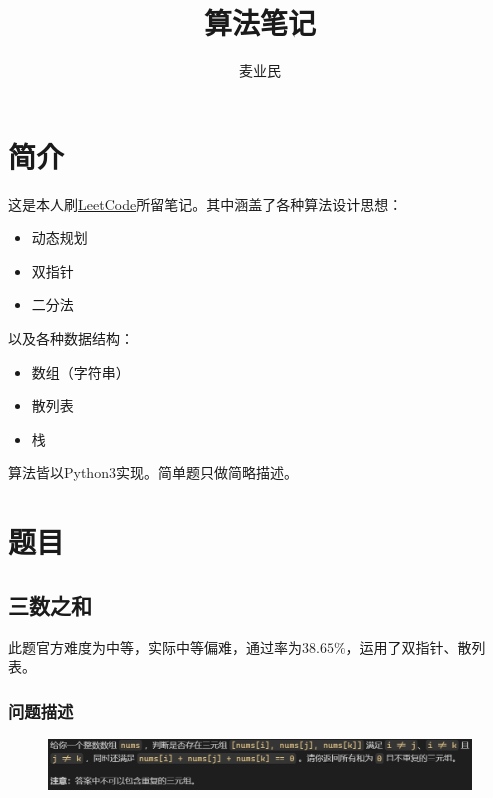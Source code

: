 \documentclass{article}
\begin{document}
\title{算法笔记}
\author{麦业民}
\date{}
\maketitle
\setlength{\parindent}{0em}

\section{简介}
\label{sec:intro}
这是本人刷\href{https://leetcode.cn/}{LeetCode}所留笔记。其中涵盖了各种算法设计思想：
\begin{itemize}
    \item 动态规划
    \item 双指针
    \item 二分法
\end{itemize}
以及各种数据结构：
\begin{itemize}
    \item 数组（字符串）
    \item 散列表
    \item 栈
\end{itemize}
\par
算法皆以Python3实现。简单题只做简略描述。

\section{题目}
\label{sec:questions}

\subsection{三数之和}
\label{sec:three-sum}
此题官方难度为中等，实际中等偏难，通过率为$38.65\%$，运用了双指针、散列表。

\subsubsection*{问题描述}

\begin{figure}[H]
\includegraphics[width=\linewidth]{img/15-1.png}
\end{figure}
\end{document}
